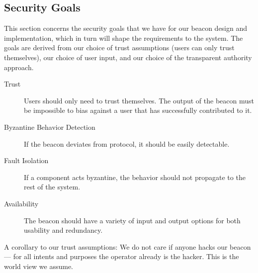 \subsection{Security Goals}
This section concerns the security goals that we have for our beacon design and implementation, which in turn will shape the requirements to the system. The goals are derived from our choice of trust assumptions (users can only trust themselves), our choice of user input, and our choice of the transparent authority approach.

\begin{description}
	\item [Trust] Users should only need to trust themselves. The output of the beacon must be impossible to bias against a user that has successfully contributed to it. 
    \item [Byzantine Behavior Detection] If the beacon deviates from protocol, it should be easily detectable.
    \item [Fault Isolation] If a component acts byzantine, the behavior should not propagate to the rest of the system.
    \item [Availability] The beacon should have a variety of input and output options for both usability and redundancy. 
\end{description}

A corollary to our trust assumptions:
We do not care if anyone hacks our beacon --- for all intents and purposes the operator already is the hacker. This is the world view we assume.
